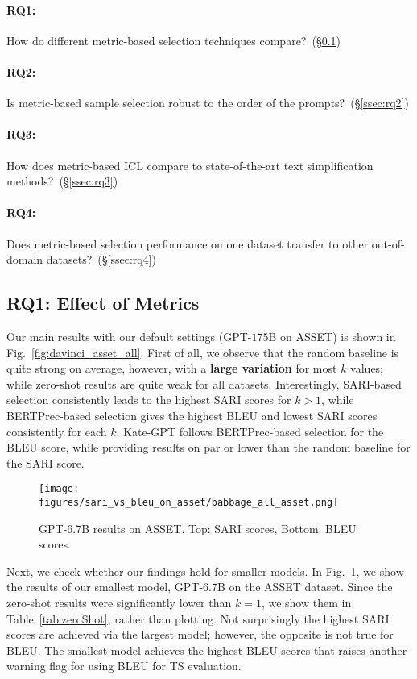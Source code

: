 \documentclass[11pt]{article}
\begin{document}
\paragraph{RQ1:} How do different metric-based selection techniques compare?~(\S\ref{ssec:rq1})

\paragraph{RQ2:} Is metric-based sample selection robust to the order of the prompts?~(\S\ref{ssec:rq2}) 

\paragraph{RQ3:} How does metric-based ICL compare to state-of-the-art text simplification methods?~(\S\ref{ssec:rq3})

\paragraph{RQ4:} Does metric-based selection performance on one dataset transfer to other out-of-domain datasets?~(\S\ref{ssec:rq4})

\subsection{RQ1: Effect of Metrics} 
\label{ssec:rq1}
Our main results with our default settings (GPT-$175$B on ASSET) is shown in Fig.~\ref{fig:davinci_asset_all}. First of all, we observe that the random baseline is quite strong on average, however, with a \textbf{large variation} for most $k$ values; while zero-shot results are quite weak for all datasets. Interestingly, SARI-based selection consistently leads to the highest SARI scores for $k>1$, while BERTPrec-based selection gives the highest BLEU and lowest SARI scores consistently for each $k$. Kate-GPT follows BERTPrec-based selection for the BLEU score, while providing results on par or lower than the random baseline for the SARI score. 

\begin{figure}[]
    \centering
    \texttt{[image: figures/sari\_vs\_bleu\_on\_asset/babbage\_all\_asset.png]}
    \caption{GPT-6.7B results on ASSET. Top: SARI scores, Bottom: BLEU scores.}
    \label{fig:babbage_asset_all}
\end{figure}

Next, we check whether our findings hold for smaller models. In Fig.~\ref{fig:babbage_asset_all}, we show the results of our smallest model, GPT-6.7B on the ASSET dataset. Since the zero-shot results were significantly lower than $k=1$, we show them in Table~\ref{tab:zeroShot}, rather than plotting. Not surprisingly the highest SARI scores are achieved via the largest model; however, the opposite is not true for BLEU. The smallest model achieves the highest BLEU scores that raises another warning flag for using BLEU for TS evaluation. 
\end{document}
